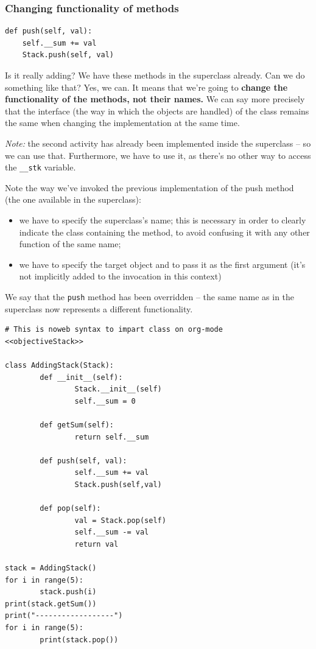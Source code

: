 \documentclass[11pt]{article}
\begin{document}
\subsubsection{Changing functionality of methods}
\label{sec:org0ba961c}

\begin{verbatim}
def push(self, val):
    self.__sum += val
    Stack.push(self, val)
\end{verbatim}

Is it really adding? We have these methods in the superclass
already. Can we do something like that? Yes, we can. It means that
we’re going to \textbf{change the functionality of the methods, not their
names.} We can say more precisely that the interface (the way in which
the objects are handled) of the class remains the same when changing
the implementation at the same time.

\emph{Note:} the second activity has already been implemented inside the
superclass – so we can use that. Furthermore, we have to use it, as
there’s no other way to access the \texttt{\_\_stk} variable.

Note the way we’ve invoked the previous implementation of the push
method (the one available in the superclass):
\begin{itemize}
\item we have to specify the superclass’s name; this is necessary in order
to clearly indicate the class containing the method, to avoid
confusing it with any other function of the same name;
\item we have to specify the target object and to pass it as the first
argument (it’s not implicitly added to the invocation in this
context)
\end{itemize}

We say that the \texttt{push} method has been overridden – the same name as
in the superclass now represents a different functionality.

\begin{verbatim}
# This is noweb syntax to impart class on org-mode
<<objectiveStack>>

class AddingStack(Stack):
        def __init__(self):
                Stack.__init__(self)
                self.__sum = 0

        def getSum(self):
                return self.__sum

        def push(self, val):
                self.__sum += val
                Stack.push(self,val)

        def pop(self):
                val = Stack.pop(self)
                self.__sum -= val
                return val

stack = AddingStack()
for i in range(5):
        stack.push(i)
print(stack.getSum())
print("------------------")
for i in range(5):
        print(stack.pop())
\end{verbatim}
\end{document}

